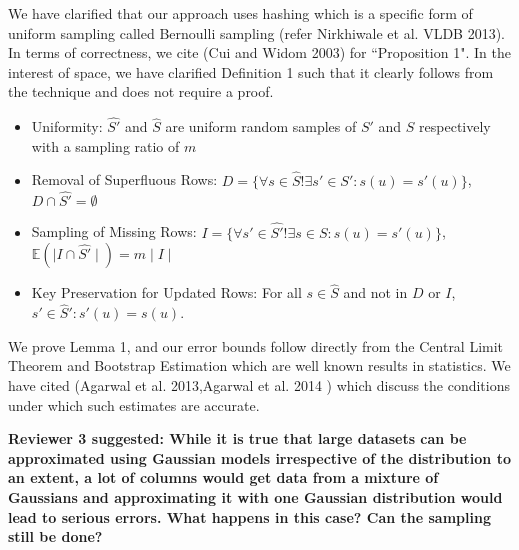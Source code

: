 We have clarified that our approach uses hashing which is a specific form of uniform sampling called Bernoulli sampling (refer Nirkhiwale et al. VLDB 2013). In terms of correctness, we cite (Cui and Widom 2003) for ``Proposition 1". In the interest of space, we have clarified Definition 1 such that it clearly follows from the technique and does not require a proof.
\begin{itemize}[noitemsep]
\item Uniformity: $\widehat{S'}$ and $\widehat{S}$ are uniform random samples of $S'$ and $S$ respectively with a sampling ratio of $m$
\item Removal of Superfluous Rows: $D = \{\forall s \in \widehat{S} !\exists s' \in S': s(u) = s'(u)\}$, $D \cap \widehat{S'} = \emptyset$ 
\item Sampling of Missing Rows: $I = \{\forall s' \in \widehat{S'} !\exists s \in S: s(u) = s'(u)\}$, $\mathbb{E}(\mid I \cap \widehat{S'} \mid) = m\mid I \mid $ 
\item Key Preservation for Updated Rows: For all $s\in \widehat{S}$ and not in $D$ or $I$, $s' \in \widehat{S}': s'(u) = s(u)$.
\end{itemize}
We prove Lemma 1, and our error bounds follow directly from the Central Limit Theorem and Bootstrap Estimation which are well known results in statistics. We have cited (Agarwal et al. 2013,Agarwal et al. 2014 ) which discuss the conditions under which such estimates are accurate.

\vspace{1.5em}

\textbf{Reviewer 3 suggested: While it is true that large datasets can be approximated using Gaussian models irrespective of the distribution to an extent, a lot of columns would get data from a mixture of Gaussians and approximating it with one Gaussian distribution would lead to serious errors. What happens in this case? Can the sampling still be done?}

